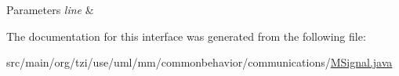 \begin{DoxyParams}{Parameters}
{\em line} & \\
\hline
\end{DoxyParams}


The documentation for this interface was generated from the following file\-:\begin{DoxyCompactItemize}
\item 
src/main/org/tzi/use/uml/mm/commonbehavior/communications/\hyperlink{_m_signal_8java}{M\-Signal.\-java}\end{DoxyCompactItemize}
